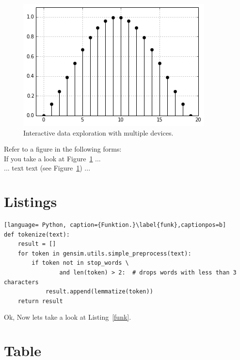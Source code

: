 \begin{figure}[ht!]
  \centering
  \includegraphics[width=1\columnwidth]{Figures/Example}
  \caption{Interactive data exploration with multiple devices.}
  \label{fig:example}
\end{figure}

Refer to a figure in the following forms:\\
If you take a look at Figure~\ref{fig:example} ...\\
... text text (see Figure~\ref{fig:example}) ...

\section{Listings}
\begin{lstlisting}[language= Python, caption={Funktion.}\label{funk},captionpos=b]
def tokenize(text):
    result = []
    for token in gensim.utils.simple_preprocess(text):
        if token not in stop_words \
                and len(token) > 2:  # drops words with less than 3 characters
            result.append(lemmatize(token))
    return result
\end{lstlisting}

Ok, Now lets take a look at Listing~\ref{funk}.

\newpage
\section{Table}

